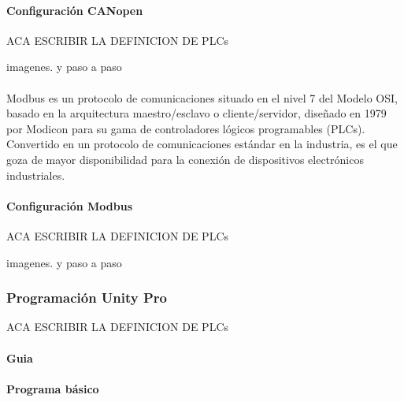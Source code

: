 	\paragraph{Configuración CANopen}
	\begin{tcolorbox}[colback=blue!5!white,colframe=blue!75!black,title=Definición]
		ACA ESCRIBIR LA DEFINICION DE PLCs
	\end{tcolorbox}
	imagenes. y paso a paso\\
	\\
	Modbus es un protocolo de comunicaciones situado en el nivel 7 del Modelo OSI, basado en la arquitectura maestro/esclavo o cliente/servidor, diseñado en 1979 por Modicon para su gama de controladores lógicos programables (PLCs). Convertido en un protocolo de comunicaciones estándar en la industria, es el que goza de mayor disponibilidad para la conexión de dispositivos electrónicos industriales.
	\paragraph{Configuración Modbus}
	\begin{tcolorbox}[colback=blue!5!white,colframe=blue!75!black,title=Definición]
		ACA ESCRIBIR LA DEFINICION DE PLCs
	\end{tcolorbox}
	imagenes. y paso a paso

	\subsubsection{Programación Unity Pro}
	\begin{tcolorbox}[colback=blue!5!white,colframe=blue!75!black,title=Definición]
		ACA ESCRIBIR LA DEFINICION DE PLCs
	\end{tcolorbox}
	\paragraph{Guia}
	\paragraph{Programa básico}
	\newpage

